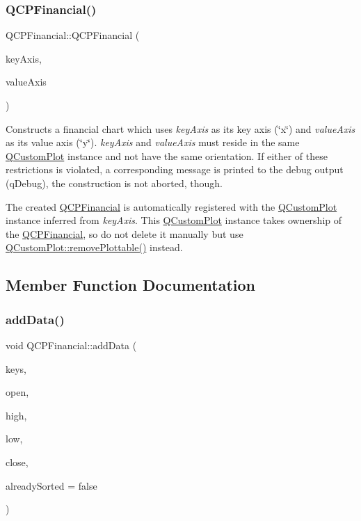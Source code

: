 \subsubsection{\texorpdfstring{Q\+C\+P\+Financial()}{QCPFinancial()}}
{\footnotesize\ttfamily Q\+C\+P\+Financial\+::\+Q\+C\+P\+Financial (\begin{DoxyParamCaption}\item[{\hyperlink{classQCPAxis}{Q\+C\+P\+Axis} $\ast$}]{key\+Axis,  }\item[{\hyperlink{classQCPAxis}{Q\+C\+P\+Axis} $\ast$}]{value\+Axis }\end{DoxyParamCaption})\hspace{0.3cm}{\ttfamily [explicit]}}

Constructs a financial chart which uses {\itshape key\+Axis} as its key axis (\char`\"{}x\char`\"{}) and {\itshape value\+Axis} as its value axis (\char`\"{}y\char`\"{}). {\itshape key\+Axis} and {\itshape value\+Axis} must reside in the same \hyperlink{classQCustomPlot}{Q\+Custom\+Plot} instance and not have the same orientation. If either of these restrictions is violated, a corresponding message is printed to the debug output (q\+Debug), the construction is not aborted, though.

The created \hyperlink{classQCPFinancial}{Q\+C\+P\+Financial} is automatically registered with the \hyperlink{classQCustomPlot}{Q\+Custom\+Plot} instance inferred from {\itshape key\+Axis}. This \hyperlink{classQCustomPlot}{Q\+Custom\+Plot} instance takes ownership of the \hyperlink{classQCPFinancial}{Q\+C\+P\+Financial}, so do not delete it manually but use \hyperlink{classQCustomPlot_af3dafd56884208474f311d6226513ab2}{Q\+Custom\+Plot\+::remove\+Plottable()} instead. 

\subsection{Member Function Documentation}
\mbox{\label{classQCPFinancial_a372ac031e44a7a6c912d203556af96f7}} 
\subsubsection{\texorpdfstring{add\+Data()}{addData()}\hspace{0.1cm}{\footnotesize\ttfamily [1/2]}}
{\footnotesize\ttfamily void Q\+C\+P\+Financial\+::add\+Data (\begin{DoxyParamCaption}\item[{const Q\+Vector$<$ double $>$ \&}]{keys,  }\item[{const Q\+Vector$<$ double $>$ \&}]{open,  }\item[{const Q\+Vector$<$ double $>$ \&}]{high,  }\item[{const Q\+Vector$<$ double $>$ \&}]{low,  }\item[{const Q\+Vector$<$ double $>$ \&}]{close,  }\item[{bool}]{already\+Sorted = {\ttfamily false} }\end{DoxyParamCaption})}

